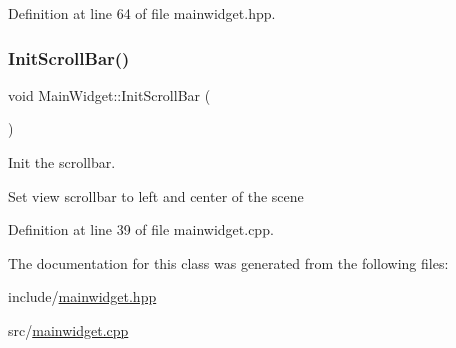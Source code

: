 Definition at line 64 of file mainwidget.\+hpp.

\mbox{\label{classMainWidget_af544f3b04a81d63c0810a90706773d3d}} 
\subsubsection{\texorpdfstring{Init\+Scroll\+Bar()}{InitScrollBar()}}
{\footnotesize\ttfamily void Main\+Widget\+::\+Init\+Scroll\+Bar (\begin{DoxyParamCaption}{ }\end{DoxyParamCaption})}



Init the scrollbar. 

Set view scrollbar to left and center of the scene 

Definition at line 39 of file mainwidget.\+cpp.



The documentation for this class was generated from the following files\+:\begin{DoxyCompactItemize}
\item 
include/\mbox{\hyperlink{mainwidget_8hpp}{mainwidget.\+hpp}}\item 
src/\mbox{\hyperlink{mainwidget_8cpp}{mainwidget.\+cpp}}\end{DoxyCompactItemize}

